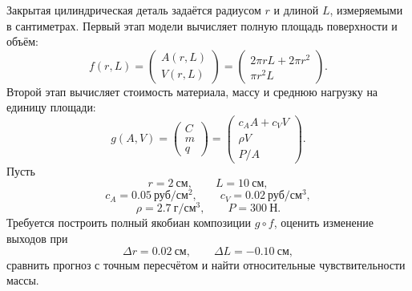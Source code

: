 \begin{problem}
Закрытая цилиндрическая деталь задаётся радиусом \(r\) и длиной \(L\), измеряемыми в сантиметрах. Первый этап модели вычисляет полную площадь поверхности и объём:
\[
f(r,L)
=
\begin{pmatrix}
A(r,L)\\
V(r,L)
\end{pmatrix}
=
\begin{pmatrix}
2\pi rL+2\pi r^2\\
\pi r^2L
\end{pmatrix}.
\]
Второй этап вычисляет стоимость материала, массу и среднюю нагрузку на единицу площади:
\[
g(A,V)
=
\begin{pmatrix}
C\\
m\\
q
\end{pmatrix}
=
\begin{pmatrix}
c_AA+c_VV\\
\rho V\\
P/A
\end{pmatrix}.
\]
Пусть
\[
r=2\ \text{см},
\qquad
L=10\ \text{см},
\]
\[
c_A=0.05\ \text{руб}/\text{см}^2,
\qquad
c_V=0.02\ \text{руб}/\text{см}^3,
\]
\[
\rho=2.7\ \text{г}/\text{см}^3,
\qquad
P=300\ \text{Н}.
\]
Требуется построить полный якобиан композиции \(g\circ f\), оценить изменение выходов при
\[
\Delta r=0.02\ \text{см},
\qquad
\Delta L=-0.10\ \text{см},
\]
сравнить прогноз с точным пересчётом и найти относительные чувствительности массы.
\end{problem}

